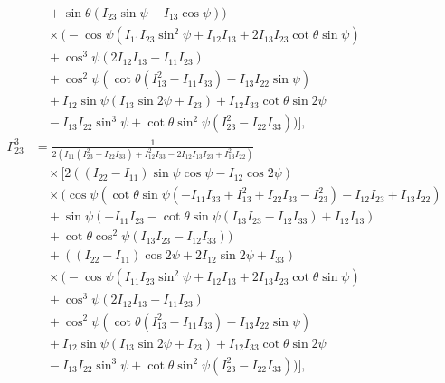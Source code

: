 \documentclass[lineno, pdflatex,sn-mathphys-ay]{sn-jnl}
\theoremstyle{thmstyleone}%
\theoremstyle{thmstyletwo}%
\theoremstyle{thmstylethree}%
\begin{document}
\begin{appendices}
\begin{align}
    &\quad +\sin \theta (I_{23} \sin \psi-I_{13} \cos \psi)) \nonumber \\
    &\quad \times \bigg(-\cos \psi \left(I_{11} I_{23} \sin ^2\psi+I_{12} I_{13}+2 I_{13} I_{23} \cot \theta \sin \psi\right) \nonumber \\
    &\quad +\cos ^3\psi (2 I_{12} I_{13}-I_{11} I_{23}) \nonumber \\
    &\quad +\cos ^2\psi \left(\cot \theta \left(I_{13}^2-I_{11} I_{33}\right)-I_{13} I_{22} \sin \psi\right) \nonumber \\
    &\quad +I_{12} \sin \psi (I_{13} \sin 2\psi+I_{23}) +I_{12} I_{33} \cot \theta \sin 2\psi \nonumber \\
    &\quad -I_{13} I_{22} \sin ^3\psi+\cot \theta \sin ^2\psi \left(I_{23}^2-I_{22} I_{33}\right)\bigg) \bigg], \nonumber \\
    \Gamma^{3}_{23} &= \frac{1}{2 \left(I_{11} \left(I_{23}^2-I_{22} I_{33}\right)+I_{12}^2 I_{33}-2 I_{12} I_{13} I_{23}+I_{13}^2 I_{22}\right)} \nonumber \\
    &\quad \times \bigg[ 2 ((I_{22}-I_{11}) \sin \psi \cos \psi-I_{12} \cos 2\psi) \nonumber \\
    &\quad \times \bigg(\cos \psi \left(\cot \theta \sin \psi \left(-I_{11} I_{33}+I_{13}^2+I_{22} I_{33}-I_{23}^2\right)-I_{12} I_{23}+I_{13} I_{22}\right) \nonumber \\
    &\quad +\sin \psi (-I_{11} I_{23}-\cot \theta \sin \psi (I_{13} I_{23}-I_{12} I_{33})+I_{12} I_{13}) \nonumber \\
    &\quad +\cot \theta \cos ^2\psi (I_{13} I_{23}-I_{12} I_{33})\bigg) \nonumber \\
    &\quad +((I_{22}-I_{11}) \cos 2\psi+2 I_{12} \sin 2\psi+I_{33}) \nonumber \\
    &\quad \times \bigg(-\cos \psi \left(I_{11} I_{23} \sin ^2\psi+I_{12} I_{13}+2 I_{13} I_{23} \cot \theta \sin \psi\right) \nonumber \\
    &\quad +\cos ^3\psi (2 I_{12} I_{13}-I_{11} I_{23}) \nonumber \\
    &\quad +\cos ^2\psi \left(\cot \theta \left(I_{13}^2-I_{11} I_{33}\right)-I_{13} I_{22} \sin \psi\right) \nonumber \\
    &\quad +I_{12} \sin \psi (I_{13} \sin 2\psi+I_{23}) +I_{12} I_{33} \cot \theta \sin 2\psi \nonumber \\
    &\quad -I_{13} I_{22} \sin ^3\psi+\cot \theta \sin ^2\psi \left(I_{23}^2-I_{22} I_{33}\right)\bigg) \bigg], \nonumber \\

\end{align}
\end{appendices}
\end{document}

